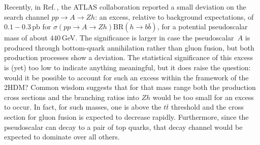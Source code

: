 \documentclass[12pt]{article}
\newcommand{\citere}[1]{Ref.\,\cite{#1}}
\newcommand{\abbrev}{\scalefont{.9}}
\newcommand{\thdm}{{\abbrev 2HDM}}
\newcommand{\atlas}{{\abbrev ATLAS}}
\begin{document}
Recently, in \citere{ATLAS:2017nxi}, the \atlas{} collaboration reported a small deviation on the search channel
$pp \to A\to Zh$: an excess, relative to background expectations, of $0.1-0.3$\,pb for $\sigma(pp \to A\to Zh)
\text{BR}(h\to b\bar{b})$, for a potential pseudoscalar mass of about $440$\,GeV.
The significance is larger in case the pseudoscalar~$A$ is produced through bottom-quark annihilation rather
than gluon fusion, but both production processes show a deviation.
The statistical significance of this excess is (yet) too low to indicate anything meaningful, but it does raise
the question: would it be possible to account for such an excess within the framework of the \thdm{}?
Common wisdom suggests that for that mass range both the production cross sections and the branching ratios
into $Zh$ would be too small for an excess to occur.
In fact, for such masses, one is above the $t\bar{t}$ threshold and the cross section for gluon fusion is expected to decrease rapidly.
Furthermore, since the pseudoscalar can decay to a pair of top quarks, that decay channel would be expected to dominate over all others.
\end{document}
